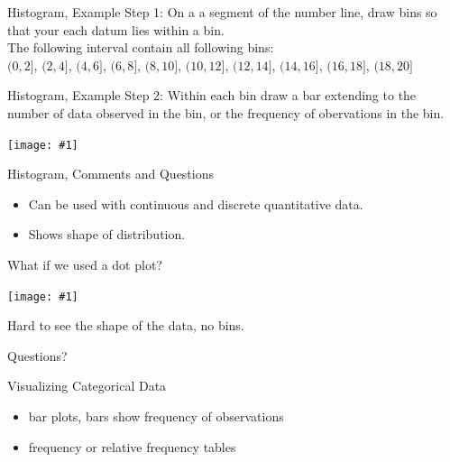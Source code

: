 \documentclass{beamer}
\newcommand{\qtns}[0]{\begin{center} Questions? \end{center}}
\newcommand{\nl}[1]{\vspace{#1 em}}
\newcommand{\cntrImg}[2]{\begin{center}\texttt{[image: \#1]}\end{center}}
\begin{document}
\begin{frame}{Histogram, Example}
    Step 1: On a a segment of the number line, draw bins so that your each datum lies within a bin. \\
    \nl{0.5}
    The following interval contain all following bins:\\ \nl{0.5}
    $(0,2]$,
    $(2,4]$,
    $(4,6]$,
    $(6,8]$,
    $(8,10]$,
    $(10,12]$,
    $(12,14]$,
    $(14,16]$,
    $(16,18]$,
    $(18,20]$
\end{frame}

\begin{frame}{Histogram, Example}
    Step 2: Within each bin draw a bar extending to the number of data observed in the bin, or the frequency of obervations in the bin.
    \cntrImg{ch01_power_hist.pdf}{0.4}
\end{frame}

\begin{frame}{Histogram, Comments and Questions}
    \begin{itemize}
        \item Can be used with continuous and discrete quantitative data.
        \item Shows shape of distribution.
    \end{itemize}
    What if we used a dot plot?
    \cntrImg{ch01_power_dot_stack.pdf}{0.5}
    Hard to see the shape of the data, no bins.
    \qtns
\end{frame}

\begin{frame}{Visualizing Categorical Data}
    \begin{itemize}
        \item bar plots, bars show frequency of observations
        \item frequency or relative frequency tables
    \end{itemize}
\end{frame}
\end{document}
